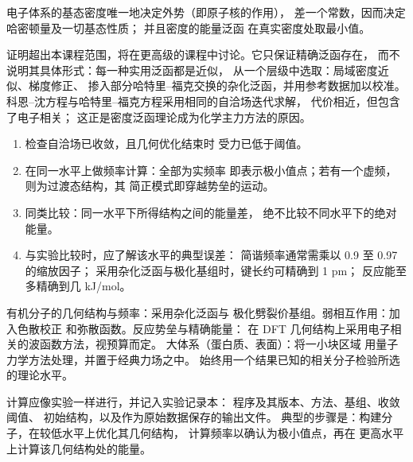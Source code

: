 \begin{theorem}\label{thm:b3:computational-chemistry:hohenberg-kohn}
电子体系的基态密度唯一地决定外势（即原子核的作用），
差一个常数，因而决定哈密顿量及一切基态性质；
并且密度的能量泛函
在真实密度处取最小值。
\end{theorem}
\admitted

证明超出本课程范围，将在更高级的课程中讨论。它只保证精确泛函存在，
而不说明其具体形式：每一种实用泛函都是近似，
从一个层级中选取：局域密度近似、梯度修正、
掺入部分哈特里–福克交换的杂化泛函，并用参考数据加以校准。
科恩–沈方程与哈特里–福克方程采用相同的自洽场迭代求解，
代价相近，但包含了电子相关；
这正是密度泛函理论成为化学主力方法的原因。

\begin{method}[阅读计算结果]\label{met:b3:computational-chemistry:read-calculation}
\begin{enumerate}
  \item 检查自洽场已收敛，且几何优化结束时
        受力已低于阈值。
  \item 在同一水平上做频率计算：全部为实频率
        即表示极小值点；若有一个虚频，则为过渡态结构，其
        简正模式即穿越势垒的运动。
  \item 同类比较：同一水平下所得结构之间的能量差，
        绝不比较不同水平下的绝对能量。
  \item 与实验比较时，应了解该水平的典型误差：
        简谐频率通常需乘以 0.9 至 0.97 的缩放因子；
        采用杂化泛函与极化基组时，键长约可精确到 1 pm；
        反应能至多精确到几 \unit{kJ/mol}。
\end{enumerate}
\end{method}

\begin{method}[选择理论水平]\label{met:b3:computational-chemistry:choose-level}
有机分子的几何结构与频率：采用杂化泛函与
极化劈裂价基组。弱相互作用：加入色散校正
和弥散函数。反应势垒与精确能量：
在 DFT 几何结构上采用电子相关的波函数方法，视预算而定。
大体系（蛋白质、表面）：将一小块区域
用量子力学方法处理，并置于经典力场之中。
始终用一个结果已知的相关分子检验所选的理论水平。
\end{method}

\begin{inthelab}[计算实验]
计算应像实验一样进行，并记入实验记录本：
程序及其版本、方法、基组、收敛阈值、
初始结构，以及作为原始数据保存的输出文件。
典型的步骤是：构建分子，在较低水平上优化其几何结构，
计算频率以确认为极小值点，再在
更高水平上计算该几何结构处的能量。
\end{inthelab}


